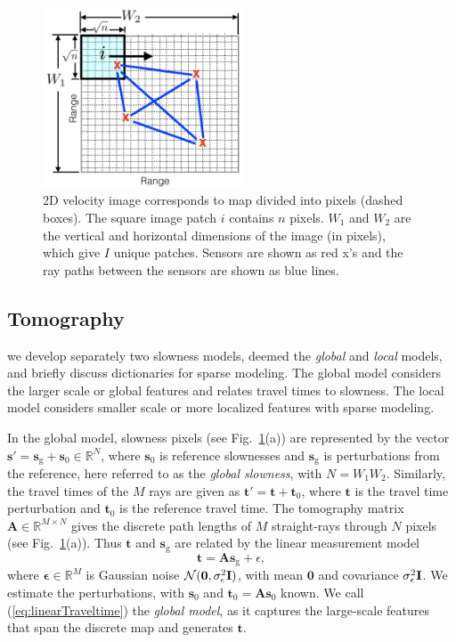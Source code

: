 \begin{figure}[t]
\centering
\includegraphics[width=6cm]{figs/patch.png} 
\caption{2D velocity image corresponds to  map divided into pixels (dashed boxes). The square image patch $i$ contains $n$ pixels. $W_1$ and $W_2$ are the vertical and horizontal dimensions of the image (in pixels), which give $I$ unique patches. Sensors are shown as red x's and the ray paths between the sensors are shown as blue lines.}
\label{fig:patchMap}
\end{figure}
\subsection{Tomography}
we develop separately two slowness models, deemed the \textit{global} and \textit{local} models,  and briefly discuss dictionaries for sparse modeling. The global model considers the larger scale or global features and relates travel times to slowness. The local model considers smaller scale or more localized features with sparse modeling. 

In the global model, slowness pixels (see Fig.~\ref{fig:patchMap}(a)) are represented by the vector $\mathbf{s'=s}_\mathrm{g}+\mathbf{s}_0\in\mathbb{R}^{N}$, where $\mathbf{s}_0$ is reference slownesses and $\mathbf{s}_\mathrm{g}$ is perturbations from the reference, here referred to as the {\it global slowness}, with $N=W_1W_2$. Similarly, the travel times of the $M$ rays are given as $\mathbf{t'=t+t}_0$, where $\mathbf{t}$ is the travel time perturbation and $\mathbf{t}_0$ is the reference travel time. The tomography matrix $\mathbf{A}\in\mathbb{R}^{M\times N}$ gives the discrete path lengths of $M$ straight-rays through $N$ pixels (see Fig.\ \ref{fig:patchMap}(a)). Thus  $\mathbf{t}$ and $\mathbf{s}_\mathrm{g}$ are related by the linear measurement model
%
\begin{equation}
\mathbf{t}=\mathbf{As}_\mathrm{g}+\epsilon,
\label{eq:linearTraveltime}
\end{equation}
%
where $\mathbf{\epsilon}\in\mathbb{R}^M$ is Gaussian noise $\mathcal{N}(\mathbf{0},\sigma_\epsilon^2\bf{I})$, with mean $\mathbf{0}$ and covariance $\sigma_\epsilon^2\bf{I}$. We estimate the perturbations, with $\mathbf{s}_0$ and $\mathbf{t}_0=\mathbf{A}\mathbf{s}_0$ known. We call (\ref{eq:linearTraveltime}) the \textit{global model}, as it captures the large-scale features that span the discrete map and generates $\mathbf{t}$. 

